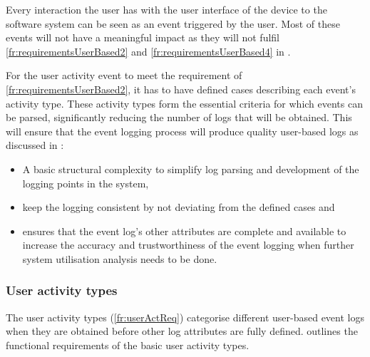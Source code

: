 Every interaction the user has with the user interface of the device to the software system can be seen as an event triggered by the user. Most of these events will not have a meaningful impact as they will not fulfil \ref{fr:requirementsUserBased2} and \ref{fr:requirementsUserBased4} in .

\clearpage

For the user activity event to meet the requirement of \ref{fr:requirementsUserBased2}, it has to have defined cases describing each event's activity type. These activity types form the essential criteria for which events can be parsed, significantly reducing the number of logs that will be obtained. This will ensure that the event logging process will produce quality user-based logs as discussed in :

\begin{itemize}
	\item A basic structural complexity to simplify log parsing and development of the logging points in the system,
	\item keep the logging consistent by not deviating from the defined cases and
	\item ensures that the event log's other attributes are complete and available to increase the accuracy and trustworthiness of the event logging when further system utilisation analysis needs to be done. 
\end{itemize}

\subsubsection{User activity types}\label{sec:ch2_userActivityTypes}
The user activity types (\ref{fr:userActReq}) categorise different user-based event logs when they are obtained before other log attributes are fully defined.  outlines the functional requirements of the basic user activity types.

